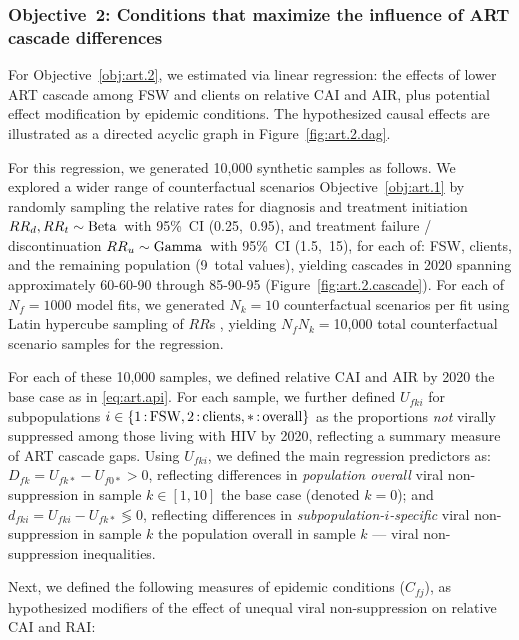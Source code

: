 \subsubsection{Objective~2: Conditions that maximize the influence of ART cascade differences}\label{art.meth.obj.2}
For Objective~\ref{obj:art.2}, we estimated via linear regression:
the effects of lower ART cascade among FSW and clients on relative CAI and AIR,
plus potential effect modification by epidemic conditions.
The hypothesized causal effects are illustrated
as a directed acyclic graph in Figure~\ref{fig:art.2.dag}.
\par
For this regression, we generated 10,000 synthetic samples as follows.
We explored a wider range of counterfactual scenarios \vs Objective~\ref{obj:art.1}
by randomly sampling the relative rates for
diagnosis and treatment initiation ${RR}_d, {RR}_t \sim \textnormal{Beta}\,$ with 95\%~CI (0.25,~0.95),
and treatment failure / discontinuation ${RR}_u \sim \textnormal{Gamma}\,$ with 95\%~CI (1.5,~15),
for each of: FSW, clients, and the remaining population (9~total values),
yielding cascades in 2020 spanning
approximately \mbox{60-60-90} through \mbox{85-90-95} (Figure~\ref{fig:art.2.cascade}). %
For each of $N_f = 1000$ model fits,
we generated $N_k = 10$ counterfactual scenarios per fit
using Latin hypercube sampling of $RR$s \cite{Stein1987},
yielding $N_f N_k = {}$10,000 total counterfactual scenario samples for the regression.
\par
For each of these 10,000 samples, we defined
relative CAI and AIR by 2020 \vs the base case as in \eqref{eq:art.api}.
For each sample, we further defined
$U_{fki}$ for subpopulations $i \in \{1{\,:\,}\textnormal{FSW}, 2{\,:\,}\textnormal{clients}, *{\,:\,}\textnormal{overall}\}$
as the proportions \emph{not} virally suppressed among those living with HIV by 2020,
reflecting a summary measure of ART cascade gaps.
Using $U_{fki}$, we defined the main regression predictors as:
$D_{fk} = U_{fk*} - U_{f0*} > 0$, reflecting differences in
\emph{population overall} viral non-suppression in sample $k \in [1,10]$
\vs the base case (denoted $k = 0$); and
$d_{fki} = U_{fki} - U_{fk*} \lessgtr 0$, reflecting differences in
\emph{subpopulation-$i$-specific} viral non-suppression in sample $k$
\vs the population overall in sample $k$ --- \ie viral non-suppression inequalities.
\par
Next, we defined the following measures of epidemic conditions ($C_{fj}$),
as hypothesized modifiers of the effect of unequal viral non-suppression on relative CAI and RAI:
